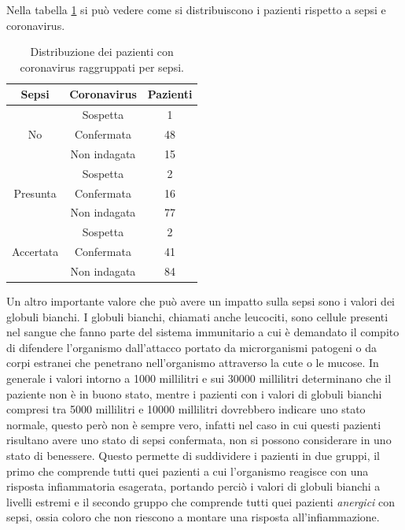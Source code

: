Nella tabella \ref{table:sepcov} si può vedere come si distribuiscono i pazienti rispetto a sepsi e coronavirus.
\begin{table}[h]
	\centering
	\begin{tabular}{  |c| c|c|} 
		\hline
		\textbf{Sepsi} & \textbf{Coronavirus} & \textbf{Pazienti}  \\
		\hline
		\multirow[t]{3}{*}{No} & Sospetta & 1 \\  \cline{2-3}
		& Confermata & 48 \\  \cline{2-3}
		& Non indagata & 15 \\
		\hline                            
		\multirow[t]{3}{*}{Presunta} & Sospetta & 2  \\ \cline{2-3}
		& Confermata & 16 \\ \cline{2-3}
		& Non indagata & 77 \\ 
		\hline
		\multirow[t]{3}{*}{Accertata} & Sospetta & 2 \\ \cline{2-3}
		& Confermata & 41 \\ \cline{2-3}
		& Non indagata & 84 \\  
		\hline 
	\end{tabular}
	\caption{Distribuzione dei pazienti con coronavirus raggruppati per sepsi.}
	\label{table:sepcov}
\end{table}



Un altro importante valore che può avere un impatto sulla sepsi sono i valori dei globuli bianchi. 
I globuli bianchi, chiamati anche leucociti, sono cellule presenti nel sangue che fanno parte del sistema immunitario a cui è demandato il compito di difendere l’organismo dall’attacco portato da microrganismi patogeni o da corpi estranei che penetrano nell’organismo attraverso la cute o le mucose.
In generale i valori intorno a 1000 millilitri e sui 30000  millilitri determinano che il paziente non è in buono stato, mentre i pazienti con i valori di globuli bianchi compresi tra 5000  millilitri  e 10000 millilitri dovrebbero indicare uno stato normale, questo però non è sempre vero, infatti nel caso in cui questi pazienti risultano avere uno stato di sepsi confermata, non si possono considerare in uno stato di benessere.
Questo permette di suddividere i pazienti in due gruppi, il primo che comprende tutti quei pazienti a cui l'organismo reagisce con una risposta infiammatoria esagerata, portando perciò i valori di globuli bianchi a livelli estremi e il secondo gruppo che comprende tutti quei pazienti \textit{anergici} con sepsi, ossia coloro che non riescono a montare una risposta all'infiammazione.

